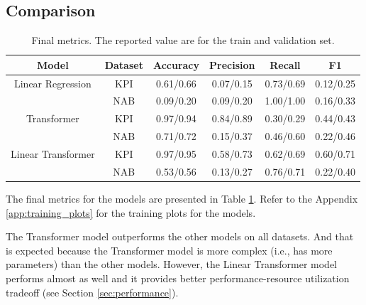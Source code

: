 \documentclass[a4paper, twoside]{report}
\theoremstyle{definition}
\numberwithin{equation}{section}
\begin{document}
\subsection{Comparison}


\begin{table}[h!]
    \centering
    \begin{tabular}{|c|c|c|c|c|c|}
        \hline
        Model              & Dataset & Accuracy  & Precision & Recall    & F1        \\
        \hline
        Linear Regression  & KPI     & 0.61/0.66 & 0.07/0.15 & 0.73/0.69 & 0.12/0.25 \\
                           & NAB     & 0.09/0.20 & 0.09/0.20 & 1.00/1.00 & 0.16/0.33 \\
        \hline
        Transformer        & KPI     & 0.97/0.94 & 0.84/0.89 & 0.30/0.29 & 0.44/0.43 \\
                           & NAB     & 0.71/0.72 & 0.15/0.37 & 0.46/0.60 & 0.22/0.46 \\
        \hline
        Linear Transformer & KPI     & 0.97/0.95 & 0.58/0.73 & 0.62/0.69 & 0.60/0.71 \\
                           & NAB     & 0.53/0.56 & 0.13/0.27 & 0.76/0.71 & 0.22/0.40 \\
        \hline
    \end{tabular}
    \caption{Final metrics. The reported value are for the train and validation set.}
    \label{tab:final_metrics}
\end{table}

The final metrics for the models are presented in Table \ref{tab:final_metrics}.
Refer to the Appendix \ref{app:training_plots} for the training plots for the models.

The Transformer model outperforms the other models on all datasets. And that
is expected because the Transformer model is more complex (i.e., has more parameters)
than the other models. However, the Linear Transformer model performs almost as well
and it provides better performance-resource utilization tradeoff (see Section \ref{sec:performance}).
\end{document}
